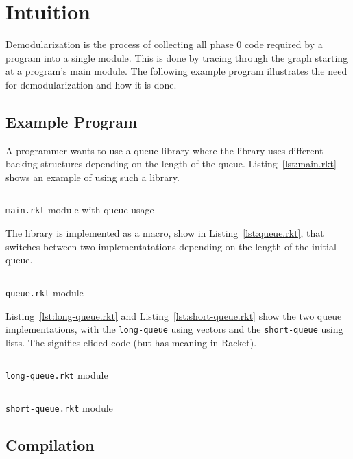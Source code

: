 \chapter{Intuition}
\label{chap:intuition}
Demodularization is the process of collecting all phase 0 code required by a program into a single module.
This is done by tracing through the  graph starting at a program's main module.
The following example program illustrates the need for demodularization and how it is done.

\section{Example Program}
A programmer wants to use a queue library where the library uses different backing structures depending on the length of the queue. 
Listing~\ref{lst:main.rkt} shows an example of using such a library.
\begin{listing}
  \inputminted{racket}{listings/main.rkt}
  \caption{\texttt{main.rkt} module with queue usage}
  \label{lst:main.rkt}
\end{listing}
The library is implemented as a macro, show in Listing~\ref{lst:queue.rkt}, that switches between two implementatations depending on the length of the initial queue.
\begin{listing}
  \inputminted{racket}{listings/queue.rkt}
  \caption{\texttt{queue.rkt} module}
  \label{lst:queue.rkt}
\end{listing}
Listing~\ref{lst:long-queue.rkt} and Listing~\ref{lst:short-queue.rkt} show the two queue implementations, with the \texttt{long-queue} using vectors and the \texttt{short-queue} using lists. 
The  signifies elided code (but  has meaning in Racket).

\begin{listing}
  \inputminted{racket}{listings/long-queue.rkt}
  \caption{\texttt{long-queue.rkt} module}
  \label{lst:long-queue.rkt}
\end{listing}

\begin{listing}
  \inputminted{racket}{listings/short-queue.rkt}
  \caption{\texttt{short-queue.rkt} module}
  \label{lst:short-queue.rkt}
\end{listing}


\section{Compilation}

